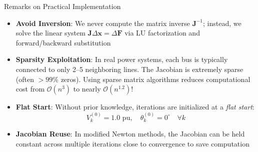\begin{frame}{Remarks on Practical Implementation}
    \begin{itemize}
        \item \textbf{Avoid Inversion}: We never compute the matrix inverse $\mathbf{J}^{-1}$; instead, we solve the linear system $\mathbf{J} \Delta \mathbf{x} = \Delta \mathbf{F}$ via LU factorization and forward/backward substitution
        \item \textbf{Sparsity Exploitation}: In real power systems, each bus is typically connected to only 2--5 neighboring lines. The Jacobian is extremely sparse (often $>99\%$ zeros). Using sparse matrix algorithms reduces computational cost from $\mathcal{O}(n^3)$ to nearly $\mathcal{O}(n^{1.2})$!
        \item \textbf{Flat Start}: Without prior knowledge, iterations are initialized at a \textit{flat start}:
        $$V_k^{(0)} = 1.0\text{ pu}, \quad \theta_k^{(0)} = 0^\circ \quad \forall k$$
        \item \textbf{Jacobian Reuse}: In modified Newton methods, the Jacobian can be held constant across multiple iterations close to convergence to save computation
    \end{itemize}
\end{frame}


